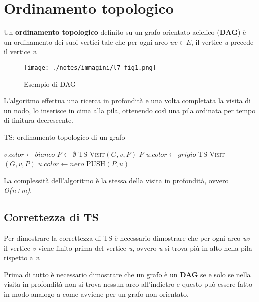 \section{Ordinamento topologico}\label{ordinamento-topologico}

Un \textbf{ordinamento topologico} definito su un grafo orientato
aciclico (\textbf{DAG}) è un ordinamento dei suoi vertici tale che per
ogni arco $uv \in E$, il vertice \emph{u} precede il vertice
\emph{v}.

\begin{figure}[htbp]
\centering
\texttt{[image: ./notes/immagini/l7-fig1.png]}
\caption{Esempio di DAG}
\end{figure}

L'algoritmo effettua una ricerca in profondità e una volta completata la
visita di un nodo, lo inserisce in cima alla pila, ottenendo così una
pila ordinata per tempo di finitura decrescente.

\begin{breakablealgorithm}
	\caption{TS: ordinamento topologico di un grafo}
	\begin{algorithmic}[1]
				\State $ v.color \gets bianco $
			\EndFor
			\State $ P \gets \emptyset $
					\State \textsc{TS-Visit}$ (G,v,P) $
				\EndIf
			\EndFor
			\State \Return $ P $
		\EndFunction
		\Statex
			\State $ u.color \gets grigio $
					\State \textsc{TS-Visit}$ (G,v,P) $
				\EndIf
			\EndFor
			\State $ u.color \gets nero $
			\State \textsc{PUSH}$ (P,u) $
		\EndFunction
	\end{algorithmic}
\end{breakablealgorithm}

La complessità dell'algoritmo è la stessa della visita in profondità,
ovvero \emph{O(n+m)}.

\subsection{Correttezza di TS}\label{correttezza-di-ts}

Per dimostrare la correttezza di \textsc{TS} è necessario dimostrare che
per ogni arco \emph{uv} il vertice \emph{v} viene finito prima del
vertice \emph{u}, ovvero \emph{u} si trova più in alto nella pila
rispetto a \emph{v}.

Prima di tutto è necessario dimostrare che un grafo è un \textbf{DAG} se
e solo se nella visita in profondità non si trova nessun arco
all'indietro e questo può essere fatto in modo analogo a come avviene
per un grafo non orientato.

